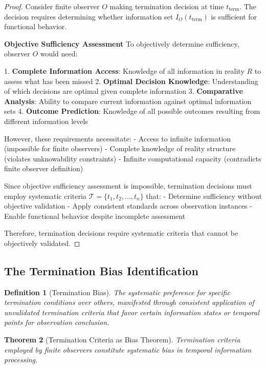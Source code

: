 \documentclass[12pt,a4paper]{article}
\newtheorem{theorem}{Theorem}[section]
\newtheorem{definition}[theorem]{Definition}
\begin{document}
\begin{proof}
Consider finite observer $O$ making termination decision at time $t_{\text{term}}$. The decision requires determining whether information set $I_O(t_{\text{term}})$ is sufficient for functional behavior.

\textbf{Objective Sufficiency Assessment}
To objectively determine sufficiency, observer $O$ would need:

1. \textbf{Complete Information Access}: Knowledge of all information in reality $R$ to assess what has been missed
2. \textbf{Optimal Decision Knowledge}: Understanding of which decisions are optimal given complete information
3. \textbf{Comparative Analysis}: Ability to compare current information against optimal information sets
4. \textbf{Outcome Prediction}: Knowledge of all possible outcomes resulting from different information levels

However, these requirements necessitate:
- Access to infinite information (impossible for finite observers)
- Complete knowledge of reality structure (violates unknowability constraints)
- Infinite computational capacity (contradicts finite observer definition)

Since objective sufficiency assessment is impossible, termination decisions must employ systematic criteria $\mathcal{T} = \{t_1, t_2, ..., t_n\}$ that:
- Determine sufficiency without objective validation
- Apply consistent standards across observation instances
- Enable functional behavior despite incomplete assessment

Therefore, termination decisions require systematic criteria that cannot be objectively validated.
\end{proof}

\subsection{The Termination Bias Identification}

\begin{definition}[Termination Bias]
The systematic preference for specific termination conditions over others, manifested through consistent application of unvalidated termination criteria that favor certain information states or temporal points for observation conclusion.
\end{definition}

\begin{theorem}[Termination Criteria as Bias Theorem]
Termination criteria employed by finite observers constitute systematic bias in temporal information processing.
\end{theorem}
\end{document}
